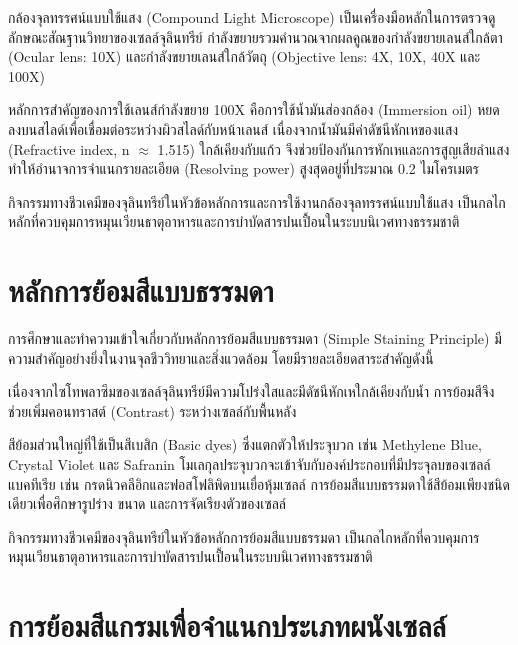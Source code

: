 กล้องจุลทรรศน์แบบใช้แสง (Compound Light Microscope) เป็นเครื่องมือหลักในการตรวจดูลักษณะสัณฐานวิทยาของเซลล์จุลินทรีย์ กำลังขยายรวมคำนวณจากผลคูณของกำลังขยายเลนส์ใกล้ตา (Ocular lens: 10X) และกำลังขยายเลนส์ใกล้วัตถุ (Objective lens: 4X, 10X, 40X และ 100X)

หลักการสำคัญของการใช้เลนส์กำลังขยาย 100X คือการใช้น้ำมันส่องกล้อง (Immersion oil) หยดลงบนสไลด์เพื่อเชื่อมต่อระหว่างผิวสไลด์กับหน้าเลนส์ เนื่องจากน้ำมันมีค่าดัชนีหักเหของแสง (Refractive index, n $\approx$ 1.515) ใกล้เคียงกับแก้ว จึงช่วยป้องกันการหักเหและการสูญเสียลำแสง ทำให้อำนาจการจำแนกรายละเอียด (Resolving power) สูงสุดอยู่ที่ประมาณ 0.2 ไมโครเมตร

\begin{conceptbox}
กิจกรรมทางชีวเคมีของจุลินทรีย์ในหัวข้อหลักการและการใช้งานกล้องจุลทรรศน์แบบใช้แสง เป็นกลไกหลักที่ควบคุมการหมุนเวียนธาตุอาหารและการบำบัดสารปนเปื้อนในระบบนิเวศทางธรรมชาติ
\end{conceptbox}

\section{หลักการย้อมสีแบบธรรมดา}

การศึกษาและทำความเข้าใจเกี่ยวกับหลักการย้อมสีแบบธรรมดา (Simple Staining Principle) มีความสำคัญอย่างยิ่งในงานจุลชีววิทยาและสิ่งแวดล้อม โดยมีรายละเอียดสาระสำคัญดังนี้

เนื่องจากไซโทพลาซึมของเซลล์จุลินทรีย์มีความโปร่งใสและมีดัชนีหักเหใกล้เคียงกับน้ำ การย้อมสีจึงช่วยเพิ่มคอนทราสต์ (Contrast) ระหว่างเซลล์กับพื้นหลัง

สีย้อมส่วนใหญ่ที่ใช้เป็นสีเบสิก (Basic dyes) ซึ่งแตกตัวให้ประจุบวก เช่น Methylene Blue, Crystal Violet และ Safranin โมเลกุลประจุบวกจะเข้าจับกับองค์ประกอบที่มีประจุลบของเซลล์แบคทีเรีย เช่น กรดนิวคลีอิกและฟอสโฟลิพิดบนเยื่อหุ้มเซลล์ การย้อมสีแบบธรรมดาใช้สีย้อมเพียงชนิดเดียวเพื่อศึกษารูปร่าง ขนาด และการจัดเรียงตัวของเซลล์

\begin{conceptbox}
กิจกรรมทางชีวเคมีของจุลินทรีย์ในหัวข้อหลักการย้อมสีแบบธรรมดา เป็นกลไกหลักที่ควบคุมการหมุนเวียนธาตุอาหารและการบำบัดสารปนเปื้อนในระบบนิเวศทางธรรมชาติ
\end{conceptbox}

\section{การย้อมสีแกรมเพื่อจำแนกประเภทผนังเซลล์}


